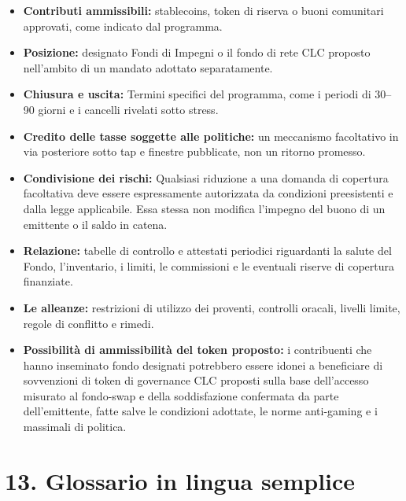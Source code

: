 \documentclass[11pt]{article}
\begin{document}
\begin{itemize}[leftmargin=*]
\item \textbf{Contributi ammissibili:} stablecoins, token di riserva o buoni comunitari approvati, come indicato dal programma.
\item \textbf{Posizione:} designato Fondi di Impegni o il fondo di rete CLC proposto nell'ambito di un mandato adottato separatamente.
\item \textbf{Chiusura e uscita:} Termini specifici del programma, come i periodi di 30--90 giorni e i cancelli rivelati sotto stress.
\item \textbf{Credito delle tasse soggette alle politiche:} un meccanismo facoltativo in via posteriore sotto tap e finestre pubblicate, non un ritorno promesso.
\item \textbf{Condivisione dei rischi:} Qualsiasi riduzione a una domanda di copertura facoltativa deve essere espressamente autorizzata da condizioni preesistenti e dalla legge applicabile. Essa stessa non modifica l'impegno del buono di un emittente o il saldo in catena.
\item \textbf{Relazione:} tabelle di controllo e attestati periodici riguardanti la salute del Fondo, l'inventario, i limiti, le commissioni e le eventuali riserve di copertura finanziate.
\item \textbf{Le alleanze:} restrizioni di utilizzo dei proventi, controlli oracali, livelli limite, regole di conflitto e rimedi.
\item \textbf{Possibilità di ammissibilità del token proposto:} i contribuenti che hanno inseminato fondo designati potrebbero essere idonei a beneficiare di sovvenzioni di token di governance CLC proposti sulla base dell'accesso misurato al fondo-swap e della soddisfazione confermata da parte dell'emittente, fatte salve le condizioni adottate, le norme anti-gaming e i massimali di politica.
\end{itemize}


\section*{13. Glossario in lingua semplice}
\end{document}
